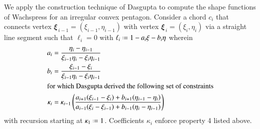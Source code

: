 We apply the construction technique of Dasgupta \cite{Dasgupta03} to compute the shape functions of Wachspress for an irregular convex pentagon.  Consider a chord $c_i$ that connects vertex $\mathbfit{\xi}_{\,i-1} = (\xi_{i-1} , \eta_{i-1})$ with vertex $\mathbfit{\xi}_{\,i} = (\xi_i , \eta_i)$ via a straight line segment such that $\ell_i = 0$ with $\ell_i \defeq 1 - a_{i} \xi - b_i \eta$ wherein
\begin{subequations}
	\begin{align}
	a_i & = \frac{\eta_i - \eta_{i-1}}{\xi_{i-1} \eta_i - \xi_i \eta_{i-1}} \\
	b_i & = \frac{\xi_{i-1} - \xi_i}{\xi_{i-1} \eta_i - \xi_i \eta_{i-1}} \\
	\intertext{for which Dasgupta derived the following set of constraints}
	\kappa_i & = \kappa_{i-1} \left( 
	\frac{a_{i+1} (\xi_{i-1} - \xi_i) + b_{i+1} (\eta_{i-1} - \eta_i)}
	{a_{i-1} (\xi_i - \xi_{i-1}) + b_{i-1} (\eta_i - \eta_{i-1})} \right) 
	\end{align}
\end{subequations}
with recursion starting at $\kappa_1 \defeq 1$.  Coefficients $\kappa_i$ enforce property 4 listed above.

